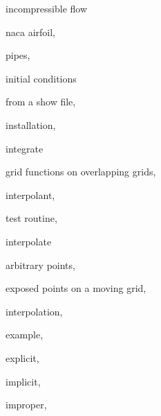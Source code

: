 \begin{description}
  \item incompressible flow
   \begin{description}
    \item naca airfoil, 
    \item pipes, 
   \end{description}
  \item initial conditions
   \begin{description}
    \item from a show file, 
   \end{description}
  \item installation, 
  \item integrate
   \begin{description}
    \item grid functions on overlapping grids, 
   \end{description}
  \item interpolant, 
   \begin{description}
    \item test routine, 
   \end{description}
  \item interpolate
   \begin{description}
    \item arbitrary points, 
    \item exposed points on a moving grid, 
   \end{description}
  \item interpolation, 
   \begin{description}
    \item example, 
    \item explicit, 
    \item implicit, 
    \item improper, 

\end{description}
\end{description}
